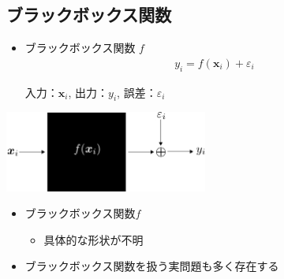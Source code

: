 \documentclass[dvipdfmx, 10.5pt]{beamer}
\begin{document}



\subsection{ブラックボックス関数}
\begin{frame}{\insertsubsection}
	\begin{itemize}
		\item ブラックボックス関数 $f$
		\begin{align*}
			y_i = f(\bm x_i) + \varepsilon_i
		\end{align*}
		\begin{center}
			入力：$\bm x_i$,\quad
			出力：$y_i$,\quad
			誤差：$\varepsilon_i$
		\end{center}
	\end{itemize}

	\vspace{5pt}
	\begin{center}
		\includegraphics[width=0.50\textwidth]{./Fig/blackbox.pdf}
	\end{center}
	\vspace{5pt}
	
	\begin{itemize}
		\item ブラックボックス関数$f$
		\begin{itemize}
			\item 具体的な形状が不明
		\end{itemize}
		\item ブラックボックス関数を扱う実問題も多く存在する
	\end{itemize}
\end{frame}

\end{document}
